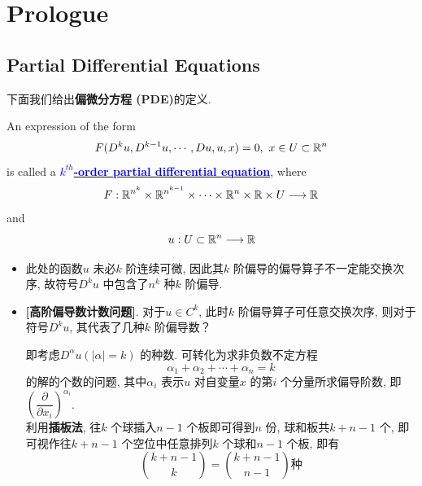 \ifx\allfiles\undefined


	\else
	\fi
\chapter{Prologue}
\section{Partial Differential Equations}
	下面我们给出\textbf{偏微分方程 (PDE)}的定义.
	\begin{defn}\label{def 1.1.1}
		An expression of the form
		\[ F(D^k u , D^{k - 1}u , \cdots , Du , u , x) = 0 , \,\, x \in U \subset \mathbb{R}^n \]
		is called a \underline{\textcolor{blue}{\textbf{$k^{th}$-order partial differential equation}}}, where
		\[ F : \mathbb{R}^{n^{k}} \times \mathbb{R}^{n^{k - 1}} \times \cdots \times \mathbb{R}^n \times \mathbb{R} \times U \longrightarrow \mathbb{R} \]
		and
		\[ u : U \subset \mathbb{R}^n \longrightarrow \mathbb{R} \]
		
		\vspace*{2em}
		
		\begin{rmk}
			\begin{itemize}
				\item 此处的函数$u$ 未必$k$ 阶连续可微, 因此其$k$ 阶偏导的偏导算子不一定能交换次序, 故符号$D^{k}u$ 中包含了$n^k$ 种$k$ 阶偏导.
				
				\vspace{2em}
				
				\item \textbf{[高阶偏导数计数问题]}. 对于$u \in C^k$, 此时$k$ 阶偏导算子可任意交换次序, 则对于符号$D^k u$, 其代表了几种$k$ 阶偏导数？
				
				\vspace{2em}
				
				\begin{solution}
					即考虑$D^{\alpha} u (\left| \alpha \right| = k)$ 的种数. 可转化为求非负数不定方程
					\[ \alpha_1 + \alpha_2 + \cdots + \alpha_n = k \]
					的解的个数的问题, 其中$\alpha_i$ 表示$u$ 对自变量$x$ 的第$i$ 个分量所求偏导阶数, 即$(\dfrac{\partial}{\partial x_i})^{\alpha_i}$. \\
					利用\textbf{插板法}, 往$k$ 个球插入$n - 1$ 个板即可得到$n$ 份, 球和板共$k + n - 1$ 个, 即可视作往$k + n - 1$ 个空位中任意排列$k$ 个球和$n - 1$ 个板, 即有
					\[ {k + n - 1 \choose k} = {k + n - 1 \choose n - 1} \text{种}  \]
				\end{solution}
			\end{itemize}
		\end{rmk}
	\end{defn}
	
